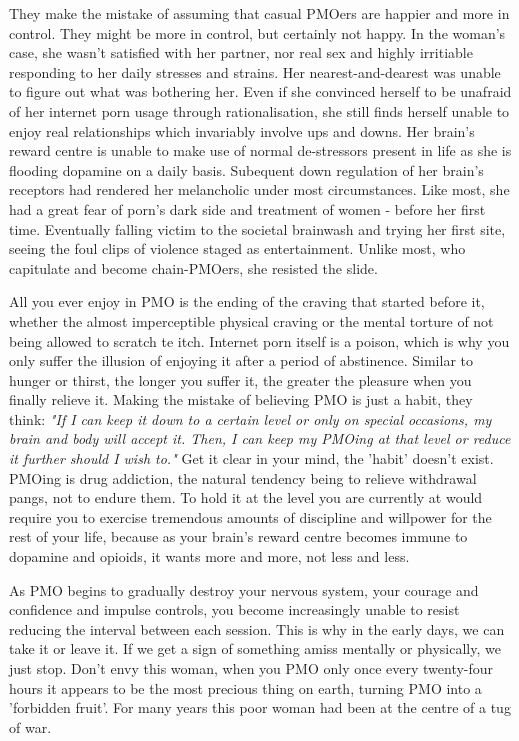 \documentclass[easypeasy]{subfiles}
\begin{document}
They make the mistake of assuming that casual PMOers are happier and more in control. They might be more in control, but certainly not happy. In the woman's case, she wasn't satisfied with her partner, nor real sex and highly irritiable responding to her daily stresses and strains. Her nearest-and-dearest was unable to figure out what was bothering her. Even if she convinced herself to be unafraid of her internet porn usage through rationalisation, she still finds herself unable to enjoy real relationships which invariably involve ups and downs. Her brain's reward centre is unable to make use of normal de-stressors present in life as she is flooding dopamine on a daily basis. Subequent down regulation of her brain's receptors had rendered her melancholic under most circumstances. Like most, she had a great fear of porn's dark side and treatment of women - before her first time. Eventually falling victim to the societal brainwash and trying her first site, seeing the foul clips of violence staged as entertainment. Unlike most, who capitulate and become chain-PMOers, she resisted the slide.

All you ever enjoy in PMO is the ending of the craving that started before it, whether the almost imperceptible physical craving or the mental torture of not being allowed to scratch te itch. Internet porn itself is a poison, which is why you only suffer the illusion of enjoying it after a period of abstinence. Similar to hunger or thirst, the longer you suffer it, the greater the pleasure when you finally relieve it. Making the mistake of believing PMO is just a habit, they think: \textit{"If I can keep it down to a certain level or only on special occasions, my brain and body will accept it. Then, I can keep my PMOing at that level or reduce it further should I wish to."} Get it clear in your mind, the 'habit' doesn't exist. PMOing is drug addiction, the natural tendency being to relieve withdrawal pangs, not to endure them. To hold it at the level you are currently at would require you to exercise tremendous amounts of discipline and willpower for the rest of your life, because as your brain's reward centre becomes immune to dopamine and opioids, it wants more and more, not less and less. 

As PMO begins to gradually destroy your nervous system, your courage and confidence and impulse controls, you become increasingly unable to resist reducing the interval between each session. This is why in the early days, we can take it or leave it. If we get a sign of something amiss mentally or physically, we just stop. Don't envy this woman, when you PMO only once every twenty-four hours it appears to be the most precious thing on earth, turning PMO into a 'forbidden fruit'. For many years this poor woman had been at the centre of a tug of war.
\end{document}
